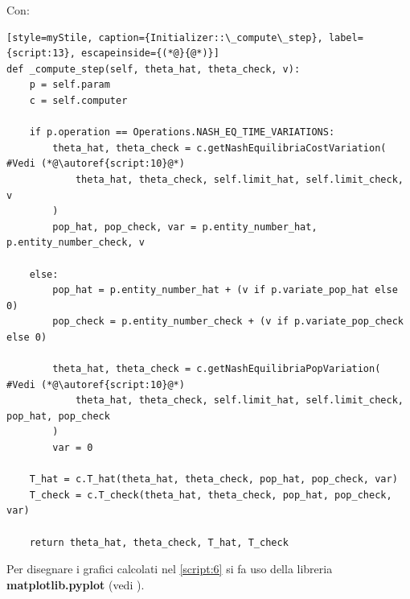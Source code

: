 Con:
\begin{lstlisting}[style=myStile, caption={Initializer::\_compute\_step}, label={script:13}, escapeinside={(*@}{@*)}]
def _compute_step(self, theta_hat, theta_check, v):
    p = self.param
    c = self.computer

    if p.operation == Operations.NASH_EQ_TIME_VARIATIONS:
        theta_hat, theta_check = c.getNashEquilibriaCostVariation(  #Vedi (*@\autoref{script:10}@*)
            theta_hat, theta_check, self.limit_hat, self.limit_check, v
        )
        pop_hat, pop_check, var = p.entity_number_hat, p.entity_number_check, v

    else:
        pop_hat = p.entity_number_hat + (v if p.variate_pop_hat else 0)
        pop_check = p.entity_number_check + (v if p.variate_pop_check else 0)

        theta_hat, theta_check = c.getNashEquilibriaPopVariation(   #Vedi (*@\autoref{script:10}@*)
            theta_hat, theta_check, self.limit_hat, self.limit_check, pop_hat, pop_check
        )
        var = 0

    T_hat = c.T_hat(theta_hat, theta_check, pop_hat, pop_check, var)
    T_check = c.T_check(theta_hat, theta_check, pop_hat, pop_check, var)

    return theta_hat, theta_check, T_hat, T_check
\end{lstlisting}

Per disegnare i grafici calcolati nel \autoref{script:6} si fa uso della libreria \textbf{matplotlib.pyplot} (vedi \cite{matplotlib_docs}).


